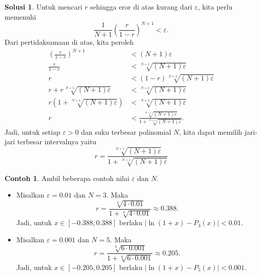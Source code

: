 \documentclass[a4paper]{article}
\theoremstyle{definition}
\newtheorem*{solusi}{Solusi}
\newtheorem*{contoh}{Contoh}
\begin{document}
\begin{enumerate}
\begin{solusi}
          Untuk mencari $r$ sehingga eror di atas kurang dari $\varepsilon$, kita perlu memenuhi
          \[
            \frac{1}{N+1}\left(\frac{r}{1-r}\right)^{N+1} < \varepsilon.
          \]
          Dari pertidaksamaan di atas, kita peroleh
          \begin{align*}
            \left(\frac{r}{1-r}\right)^{N+1}               & < (N+1)\varepsilon                                                       \\
            \frac{r}{1-r}                                  & < \sqrt[N+1]{(N+1)\varepsilon}                                           \\
            r                                              & < (1-r)\sqrt[N+1]{(N+1)\varepsilon}                                      \\
            r + r\sqrt[N+1]{(N+1)\varepsilon}              & < \sqrt[N+1]{(N+1)\varepsilon}                                           \\
            r\left(1 + \sqrt[N+1]{(N+1)\varepsilon}\right) & < \sqrt[N+1]{(N+1)\varepsilon}                                           \\
            r                                              & < \frac{\sqrt[N+1]{(N+1)\varepsilon}}{1 + \sqrt[N+1]{(N+1)\varepsilon}}.
          \end{align*}
          Jadi, untuk setiap $\varepsilon > 0$ dan suku terbesar polinomial $N$, kita dapat memilih jari-jari terbesar intervalnya yaitu
          \[
            r = \frac{\sqrt[N+1]{(N+1)\varepsilon}}{1 + \sqrt[N+1]{(N+1)\varepsilon}}
          \]
          \begin{contoh}
            Ambil beberapa contoh nilai $\varepsilon$ dan $N$.
            \begin{itemize}
              \item Misalkan $\varepsilon = 0.01$ dan $N=3$. Maka
                    \[
                      r = \frac{\sqrt[4]{4\cdot 0.01}}{1 + \sqrt[4]{4\cdot 0.01}} \approx 0.388.
                    \]
                    Jadi, untuk $x \in [-0.388,0.388]$ berlaku $|\ln(1+x) - P_3(x)| < 0.01$.
              \item Misalkan $\varepsilon = 0.001$ dan $N=5$. Maka
                    \[
                      r = \frac{\sqrt[6]{6\cdot 0.001}}{1 + \sqrt[6]{6\cdot 0.001}} \approx 0.205.
                    \]
                    Jadi, untuk $x \in [-0.205,0.205]$ berlaku $|\ln(1+x) - P_5(x)| < 0.001$.


\end{itemize}
\end{contoh}
\end{solusi}
\end{enumerate}
\end{document}
